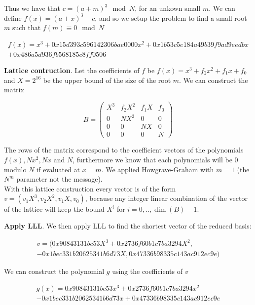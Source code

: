 \documentclass[a4paper,12pt]{report}
\begin{document}
Thus we have that $c = (a + m)^3 \mod N$, for an unkown small $m$.
We can define $f(x) = (a + x)^3 - c$, and so we setup the problem to find a small root $m$ such that $f(m) \equiv 0 \mod N$

\begin{align*}
    f(x) = x^3 + 0x15d393c596142306bae0000x^2 + 0x1b53c5e184a49b39f9ad9eedbx\\
    + 0x486a5d936fb568185c8ff0506
\end{align*}

\vspace*{10px}

\textbf{Lattice contruction}. Let the coefficients of $f$ be $f(x) = x^3 + f_2x^2 + f_1x + f_0$
and $X = 2^{16}$ be the upper bound of the size of the root $m$. We can construct the matrix

\[
B = 
\begin{pmatrix}
    X^3 & f_2X^2 & f_1X & f_0 \\
    0 & NX^2 & 0 & 0 \\
    0 & 0 & NX & 0 \\
    0 & 0 & 0 & N
\end{pmatrix}
\] 

The rows of the matrix correspond to the coefficient vectors of the polynomials $f(x), Nx^2, Nx$ and $N$, furthermore we know
that each polynomials will be 0 modulo $N$ if evaluated at $x = m$.
We applied Howgrave-Graham with $m=1$ (the $N^m$ parameter not the message).\\
With this lattice construction every vector is of the form $v = (v_1X^3, v_2X^2, v_1X, v_0)$, because any
integer linear combination of the vector of the lattice will keep the bound $X^i$ for $i=0,..,\dim(B)-1$.

\textbf{Apply LLL}. We then apply LLL to find the shortest vector of the reduced basis:

\[
    \begin{split}
    v = (0x90843131bc53X^3 + 0x2736f60b1c7ba3294X^2, \\
    -0x1bec331b20625341b6d73X, 0x47336b98335c143ac912ec9e)
    \end{split}
\]

We can construct the polynomial $g$ using the coefficients of $v$

\[
    \begin{split}
        g(x) = 0x90843131bc53x^3 + 0x2736f60b1c7ba3294x^2 \\
        -0x1bec331b20625341b6d73x + 0x47336b98335c143ac912ec9e
    \end{split}
\]
\end{document}

